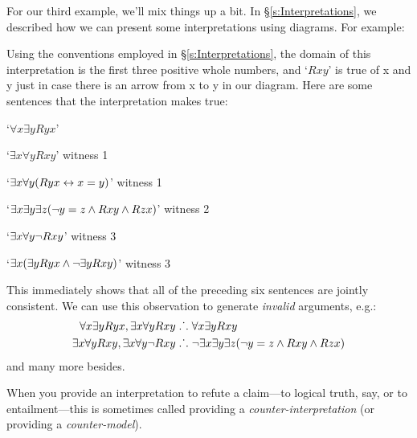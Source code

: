 For our third example, we'll mix things up a bit. In \S\ref{s:Interpretations}, we described how we can present some interpretations using diagrams. For example:
\begin{center}
\end{center}
Using the conventions employed in \S\ref{s:Interpretations}, the domain of this interpretation is the first three positive whole numbers, and `$Rxy$' is true of x and y just in case there is an arrow from x to y in our diagram. Here are some sentences that the interpretation makes true:
	\begin{ebullet}
		\item `$\forall x \exists y Ryx$' 
		\item `$\exists x \forall y Rxy$' \hfill witness 1
		\item `$\exists x \forall y (Ryx \leftrightarrow x = y)$' \hfill witness 1
		\item `$\exists x \exists y \exists z (\neg y = z \wedge Rxy \wedge Rzx)$' \hfill witness 2
		\item `$\exists x \forall y \neg Rxy$' \hfill witness 3
		\item `$\exists x (\exists y Ryx \wedge \neg \exists y Rxy)$' \hfill witness 3
	\end{ebullet}
This immediately shows that all of the preceding six sentences are jointly consistent. We can use this observation to generate \emph{invalid} arguments, e.g.:
	\begin{align*}
		\forall x \exists y Ryx, \exists x \forall y Rxy  &\mathrel{\ldotp\dot{}\,\ldotp}  \forall x \exists y Rxy\\
		\exists x \forall y Rxy, \exists x \forall y \neg Rxy & \mathrel{\ldotp\dot{}\,\ldotp} \neg \exists x \exists y \exists z (\neg y = z \wedge Rxy \wedge Rzx)
	\end{align*}
and many more besides.

When you provide an interpretation to refute a claim---to logical truth, say, or to entailment---this is sometimes called providing a \emph{counter-interpretation} (or providing a \emph{counter-model}).

